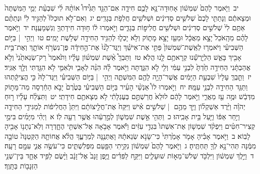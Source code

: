 \documentclass[18pt]{article}
\begin{document}
 {\loc יב~}וַיֹּ֤אמֶר לָהֶם֙ שִׁמְשׁ֔וֹן אָחֽוּדָה־נָּ֥א לָכֶ֖ם חִידָ֑ה אִם־הַגֵּ֣ד תַּגִּ֩ידוּ֩ אוֹתָ֨הּ לִ֜י שִׁבְעַ֨ת יְמֵ֤י הַמִּשְׁתֶּה֙ וּמְצָאתֶ֔ם וְנָתַתִּ֤י לָכֶם֙ שְׁלֹשִׁ֣ים סְדִינִ֔ים וּשְׁלֹשִׁ֖ים חֲלִפֹ֥ת בְּגָדִֽים׃ \startlock
 {\loc יג~}וְאִם־לֹ֣א תוּכְלוּ֮ לְהַגִּ֣יד לִי֒ וּנְתַתֶּ֨ם אַתֶּ֥ם לִי֙ שְׁלֹשִׁ֣ים סְדִינִ֔ים וּשְׁלֹשִׁ֖ים חֲלִיפ֣וֹת בְּגָדִ֑ים וַיֹּ֣אמְרוּ ל֔וֹ ח֥וּדָה חִידָתְךָ֖ וְנִשְׁמָעֶֽנָּה׃ \startlock
 {\loc יד~}וַיֹּ֣אמֶר לָהֶ֗ם מֵהָֽאֹכֵל֙ יָצָ֣א מַאֲכָ֔ל וּמֵעַ֖ז יָצָ֣א מָת֑וֹק וְלֹ֥א יָכְל֛וּ לְהַגִּ֥יד הַחִידָ֖ה שְׁלֹ֥שֶׁת יָמִֽים׃ \startlock
 {\loc טו~}וַיְהִ֣י  |  בַּיּ֣וֹם הַשְּׁבִיעִ֗י וַיֹּאמְר֤וּ לְאֵֽשֶׁת־שִׁמְשׁוֹן֙ פַּתִּ֣י אֶת־אִישֵׁ֗ךְ וְיַגֶּד־לָ֙נוּ֙ אֶת־הַ֣חִידָ֔ה פֶּן־נִשְׂרֹ֥ף אוֹתָ֛ךְ וְאֶת־בֵּ֥ית אָבִ֖יךְ בָּאֵ֑שׁ הַלְיׇרְשֵׁ֕נוּ קְרָאתֶ֥ם לָ֖נוּ הֲלֹֽא׃ \startlock
 {\loc טז~}וַתֵּבְךְּ֩ אֵ֨שֶׁת שִׁמְשׁ֜וֹן עָלָ֗יו וַתֹּ֙אמֶר֙ רַק־שְׂנֵאתַ֙נִי֙ וְלֹ֣א אֲהַבְתָּ֔נִי הַחִידָ֥ה חַ֙דְתָּ֙ לִבְנֵ֣י עַמִּ֔י וְלִ֖י לֹ֣א הִגַּ֑דְתָּה וַיֹּ֣אמֶר לָ֗הּ הִנֵּ֨ה לְאָבִ֧י וּלְאִמִּ֛י לֹ֥א הִגַּ֖דְתִּי וְלָ֥ךְ אַגִּֽיד׃ \startlock
 {\loc יז~}וַתֵּ֤בְךְּ עָלָיו֙ שִׁבְעַ֣ת הַיָּמִ֔ים אֲשֶׁר־הָיָ֥ה לָהֶ֖ם הַמִּשְׁתֶּ֑ה וַיְהִ֣י  |  בַּיּ֣וֹם הַשְּׁבִיעִ֗י וַיַּגֶּד־לָהּ֙ כִּ֣י הֱצִיקַ֔תְהוּ וַתַּגֵּ֥ד הַחִידָ֖ה לִבְנֵ֥י עַמָּֽהּ׃ \startlock
 {\loc יח~}וַיֹּ֣אמְרוּ לוֹ֩ אַנְשֵׁ֨י הָעִ֜יר בַּיּ֣וֹם הַשְּׁבִיעִ֗י בְּטֶ֙רֶם֙ יָבֹ֣א הַחַ֔רְסָה מַה־מָּת֣וֹק מִדְּבַ֔שׁ וּמֶ֥ה עַ֖ז מֵאֲרִ֑י וַיֹּ֣אמֶר לָהֶ֔ם לוּלֵא֙ חֲרַשְׁתֶּ֣ם בְּעֶגְלָתִ֔י לֹ֥א מְצָאתֶ֖ם חִידָתִֽי׃ \startlock
 {\loc יט~}וַתִּצְלַ֨ח עָלָ֜יו ר֣וּחַ יְהֹוָ֗ה וַיֵּ֨רֶד אַשְׁקְל֜וֹן וַיַּ֥ךְ מֵהֶ֣ם  |  שְׁלֹשִׁ֣ים אִ֗ישׁ וַיִּקַּח֙ אֶת־חֲלִ֣יצוֹתָ֔ם וַיִּתֵּן֙ הַחֲלִיפ֔וֹת לְמַגִּידֵ֖י הַחִידָ֑ה וַיִּ֣חַר אַפּ֔וֹ וַיַּ֖עַל בֵּ֥ית אָבִֽיהוּ׃ \startlock
 {\loc כ~}וַתְּהִ֖י אֵ֣שֶׁת שִׁמְשׁ֑וֹן לְמֵ֣רֵעֵ֔הוּ אֲשֶׁ֥ר רֵעָ֖ה לֽוֹ׃ 
\startlock
 {\loc א~}וַיְהִ֨י מִיָּמִ֜ים בִּימֵ֣י קְצִיר־חִטִּ֗ים וַיִּפְקֹ֨ד שִׁמְשׁ֤וֹן אֶת־אִשְׁתּוֹ֙ בִּגְדִ֣י עִזִּ֔ים וַיֹּ֕אמֶר אָבֹ֥אָה אֶל־אִשְׁתִּ֖י הֶחָ֑דְרָה וְלֹֽא־נְתָנ֥וֹ אָבִ֖יהָ לָבֽוֹא׃ \startlock
 {\loc ב~}וַיֹּ֣אמֶר אָבִ֗יהָ אָמֹ֤ר אָמַ֙רְתִּי֙ כִּי־שָׂנֹ֣א שְׂנֵאתָ֔הּ וָאֶתְּנֶ֖נָּה לְמֵרֵעֶ֑ךָ הֲלֹ֨א אֲחוֹתָ֤הּ הַקְּטַנָּה֙ טוֹבָ֣ה מִמֶּ֔נָּה תְּהִי־נָ֥א לְךָ֖ תַּחְתֶּֽיהָ׃ \startlock
 {\loc ג~}וַיֹּ֤אמֶר לָהֶם֙ שִׁמְשׁ֔וֹן נִקֵּ֥יתִי הַפַּ֖עַם מִפְּלִשְׁתִּ֑ים כִּי־עֹשֶׂ֥ה אֲנִ֛י עִמָּ֖ם רָעָֽה׃ \startlock
 {\loc ד~}וַיֵּ֣לֶךְ שִׁמְשׁ֔וֹן וַיִּלְכֹּ֖ד שְׁלֹשׁ־מֵא֣וֹת שׁוּעָלִ֑ים וַיִּקַּ֣ח לַפִּדִ֗ים וַיֶּ֤פֶן זָנָב֙ אֶל־זָנָ֔ב וַיָּ֨שֶׂם לַפִּ֥יד אֶחָ֛ד בֵּין־שְׁנֵ֥י הַזְּנָב֖וֹת בַּתָּֽוֶךְ׃ \startlock
\end{document}
